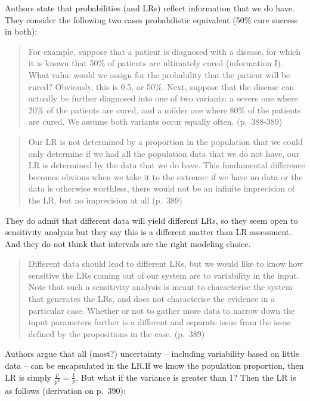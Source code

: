 \documentclass[
  10pt,
  dvipsnames,enabledeprecatedfontcommands]{scrartcl}
\begin{document}
Authors state that probabilities (and LRs) reflect information that we
do have. They consider the following two cases probabilistic equivalent
(50\% cure success in both):

\begin{quote}
For example, suppose that a patient is diagnosed with a disease, for
which it is known that 50\% of patients are ultimately cured
(information I). What value would we assign for the probability that the
patient will be cured? Obviously, this is 0.5, or 50\%. Next, suppose
that the disease can actually be further diagnosed into one of two
variants: a severe one where 20\% of the patients are cured, and a
milder one where 80\% of the patients are cured. We assume both variants
occur equally often. (p.~388-389)
\end{quote}

\begin{quote}
Our LR is not determined by a proportion in the population that we could
only determine if we had all the population data that we do not have,
our LR is determined by the data that we do have. This fundamental
difference becomes obvious when we take it to the extreme: if we have no
data or the data is otherwise worthless, there would not be an infinite
imprecision of the LR, but no imprecision at all (p.~389)
\end{quote}

\noindent They do admit that different data will yield different LRs, so
they seem open to sensitivity analysis but they say this is a different
matter than LR assessment. And they do not think that intervals are the
right modeling choice.

\begin{quote}
Different data should lead to different LRs, but we would like to know
how sensitive the LRs coming out of our system are to variability in the
input. Note that such a sensitivity analysis is meant to characterise
the system that generates the LRs, and does not characterise the
evidence in a particular case. Whether or not to gather more data to
narrow down the input parameters further is a different and separate
issue from the issue defined by the propositions in the case. (p.~389)
\end{quote}

\noindent Authors argue that all (most?) uncertainty -- including
variability based on little data -- can be encapsulated in the LR.If we
know the population proportion, then LR is simply
\(\frac{p}{p^2}=\frac{1}{p}\). But what if the variance is greater than
1? Then the LR is as follows (derivation on p.~390):
\end{document}
